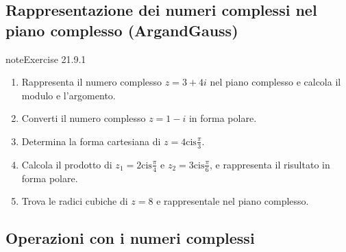 \documentclass[letterpaper,10pt,italian]{jupyterBook}
\begin{document}
\subsection{Rappresentazione dei numeri complessi nel piano complesso (Argand\sphinxhyphen{}Gauss)}
\label{\detokenize{ch/algebra/complex-algebra-problems:rappresentazione-dei-numeri-complessi-nel-piano-complesso-argand-gauss}}\label{\detokenize{ch/algebra/complex-algebra-problems:math-hs-algebra-complex-problems-complex-plane}} \label{exercise:ch/algebra/complex-algebra-problems-exercise-0}

\begin{sphinxadmonition}{note}{Exercise 21.9.1}


\begin{enumerate}
%
\item {} 
\sphinxAtStartPar
Rappresenta il numero complesso \( z = 3 + 4i \) nel piano complesso e calcola il modulo e l’argomento.

\item {} 
\sphinxAtStartPar
Converti il numero complesso \( z = 1 - i \) in forma polare.

\item {} 
\sphinxAtStartPar
Determina la forma cartesiana di \( z = 4 \text{cis}\frac{\pi}{3} \).

\item {} 
\sphinxAtStartPar
Calcola il prodotto di \( z_1 = 2 \text{cis}\frac{\pi}{4} \) e \( z_2 = 3 \text{cis}\frac{\pi}{6} \), e rappresenta il risultato in forma polare.

\item {} 
\sphinxAtStartPar
Trova le radici cubiche di \( z = 8 \) e rappresentale nel piano complesso.

\end{enumerate}
\end{sphinxadmonition}




\subsection{Operazioni con i numeri complessi}
\label{\detokenize{ch/algebra/complex-algebra-problems:operazioni-con-i-numeri-complessi}}\label{\detokenize{ch/algebra/complex-algebra-problems:math-hs-algebra-complex-problems-operations}} \label{exercise:ch/algebra/complex-algebra-problems-exercise-1}
\end{document}
